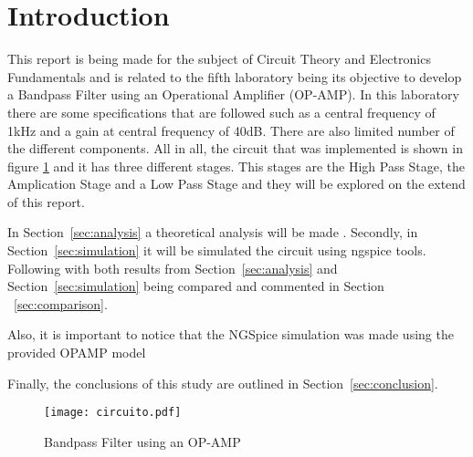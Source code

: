 \section{Introduction}
\label{sec:introduction}


\hspace{0,5cm} This report is being made for the subject of Circuit Theory and Electronics Fundamentals and is related to the fifth laboratory being its objective to develop a Bandpass Filter using an Operational Amplifier (OP-AMP). In this laboratory there are some specifications that are followed such as a central frequency of 1kHz and a gain at central frequency of 40dB. There are also limited number of the different components. All in all, the circuit that was implemented is shown in figure \ref{fig:circuito} and it has three different stages. This stages are the High Pass Stage, the Amplication Stage and a Low Pass Stage and they will be explored on the extend of this report.
\par In Section~\ref{sec:analysis} a theoretical analysis will be made . Secondly, in Section~\ref{sec:simulation} it will be simulated the circuit using ngspice tools. Following with both results from Section~\ref{sec:analysis} and Section~\ref{sec:simulation} being compared and commented in Section ~\ref{sec:comparison}. 
\par Also, it is important to notice that the NGSpice simulation was made using the provided OPAMP model
\par Finally, the conclusions of this study are outlined in Section~\ref{sec:conclusion}.

\begin{figure}[H] \centering
\texttt{[image: circuito.pdf]}
\caption{Bandpass Filter using an OP-AMP}
\label{fig:circuito}
\end{figure}


